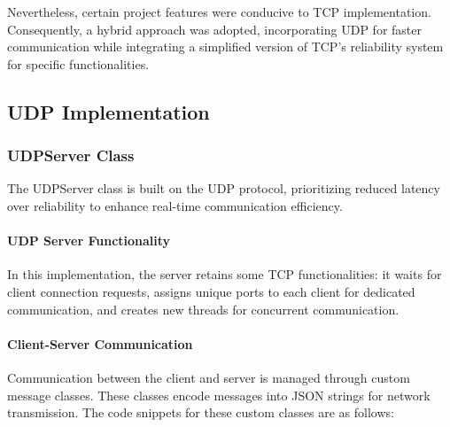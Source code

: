 Nevertheless, certain project features were conducive to TCP implementation. Consequently, a hybrid approach was adopted, incorporating UDP for faster communication while integrating a simplified version of TCP's reliability system for specific functionalities.

\subsection{UDP Implementation}
\subsubsection{UDPServer Class}
The UDPServer class is built on the UDP protocol, prioritizing reduced latency over reliability to enhance real-time communication efficiency.

\paragraph{UDP Server Functionality}
    In this implementation, the server retains some TCP functionalities: it waits for client connection requests, assigns unique ports to each client for dedicated communication, and creates new threads for concurrent communication.

\paragraph{Client-Server Communication}
    Communication between the client and server is managed through custom message classes. These classes encode messages into JSON strings for network transmission. The code snippets for these custom classes are as follows:

